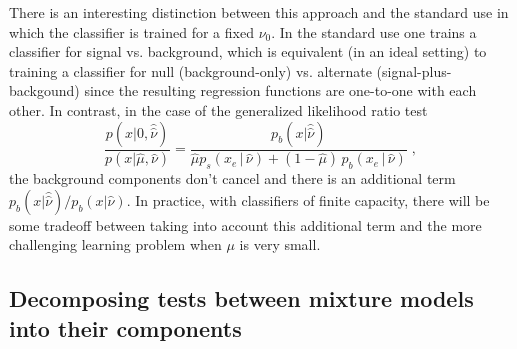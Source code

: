 \documentclass[aoas,preprint]{imsart}
\numberwithin{equation}{section}
\theoremstyle{plain}
\begin{document}
There is an interesting distinction between this approach and the standard use in which the classifier is trained for a fixed $\nu_0$. In the standard use one trains a classifier for signal vs. background, which is equivalent (in an ideal setting) to training a classifier for  null (background-only) vs. alternate (signal-plus-backgound) since the resulting regression functions are one-to-one with each other.
In contrast, in the case of the generalized likelihood ratio test 
\begin{equation}\label{eq:hep_improved}
 \frac{p(x| 0, \hat{\hat{ \nu}})}{p(x|\hat \mu, \hat\nu)} =  \frac{p_b(x| \hat{\hat{ \nu}})}{ \hat \mu p_s( x_e \, |\,  \hat\nu)  + (1- \hat \mu )\, p_b( x_e \,|\, \hat \nu)} \; ,
\end{equation}
the background components don't cancel and there is an additional term $p_b(x| \hat{\hat{ \nu}})/p_b(x| {\hat{ \nu}})$.
In practice, with classifiers of finite capacity, there will be some tradeoff between taking into account this additional term and the more challenging learning problem when $\mu$ is very small. 

\subsection{Decomposing tests between mixture models into their components}
\end{document}
